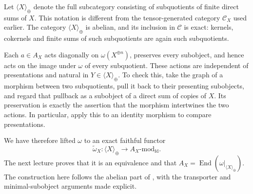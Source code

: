 Let $\langle X\rangle_{\oplus}$ denote the full subcategory consisting of subquotients of finite direct sums of $X$. This notation is different from the tensor-generated category $\mathcal C_X$ used earlier. The category $\langle X\rangle_{\oplus}$ is abelian, and its inclusion in $\mathcal C$ is exact: kernels, cokernels and finite sums of such subquotients are again such subquotients.

Each $a\in A_X$ acts diagonally on $\omega(X^{\oplus n})$, preserves every subobject, and hence acts on the image under $\omega$ of every subquotient. These actions are independent of presentations and natural in $Y\in\langle X\rangle_{\oplus}$. To check this, take the graph of a morphism between two subquotients, pull it back to their presenting subobjects, and regard that pullback as a subobject of a direct sum of copies of $X$. Its preservation is exactly the assertion that the morphism intertwines the two actions. In particular, apply this to an identity morphism to compare presentations.

We have therefore lifted $\omega$ to an exact faithful functor
\[
 \widetilde\omega_X:\langle X\rangle_{\oplus}
 \longrightarrow A_X\text{-}\mathrm{mod}_{\mathrm{fd}}.
\]
The next lecture proves that it is an equivalence and that
$A_X=\operatorname{End}(\omega|_{\langle X\rangle_{\oplus}})$. The construction here follows the abelian part of \cite[Chapter X, Section 3]{milneAGS}, with the transporter and minimal-subobject arguments made explicit.
